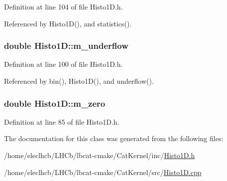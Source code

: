 Definition at line 104 of file Histo1D.h.

Referenced by Histo1D(), and statistics().\hypertarget{classHisto1D_a7f475b822f4bbb23209e2e523d228380}{
\subsubsection[{m\_\-underflow}]{\setlength{\rightskip}{0pt plus 5cm}double {\bf Histo1D::m\_\-underflow}}}
\label{classHisto1D_a7f475b822f4bbb23209e2e523d228380}


Definition at line 100 of file Histo1D.h.

Referenced by bin(), Histo1D(), and underflow().\hypertarget{classHisto1D_ac87bd1971cc300ce6fc1e745785cacb9}{
\subsubsection[{m\_\-zero}]{\setlength{\rightskip}{0pt plus 5cm}double {\bf Histo1D::m\_\-zero}}}
\label{classHisto1D_ac87bd1971cc300ce6fc1e745785cacb9}


Definition at line 85 of file Histo1D.h.

The documentation for this class was generated from the following files:\begin{DoxyCompactItemize}
\item 
/home/eleclhcb/LHCb/lbcat-\/cmake/CatKernel/inc/\hyperlink{Histo1D_8h}{Histo1D.h}\item 
/home/eleclhcb/LHCb/lbcat-\/cmake/CatKernel/src/\hyperlink{Histo1D_8cpp}{Histo1D.cpp}\end{DoxyCompactItemize}
